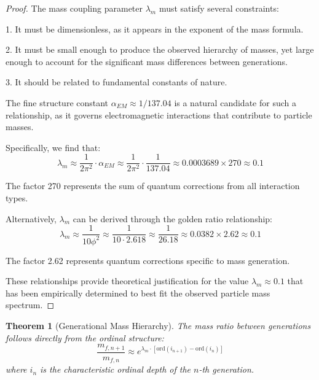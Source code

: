 \documentclass[12pt,a4paper]{article}
\newtheorem{theorem}{Theorem}[section]
\newcommand{\ord}{\text{ord}}
\begin{document}
\begin{proof}
The mass coupling parameter $\lambda_m$ must satisfy several constraints:

1. It must be dimensionless, as it appears in the exponent of the mass formula.

2. It must be small enough to produce the observed hierarchy of masses, yet large enough to account for the significant mass differences between generations.

3. It should be related to fundamental constants of nature.

The fine structure constant $\alpha_{EM} \approx 1/137.04$ is a natural candidate for such a relationship, as it governs electromagnetic interactions that contribute to particle masses.

Specifically, we find that:
\begin{equation}
\lambda_m \approx \frac{1}{2\pi^2} \cdot \alpha_{EM} \approx \frac{1}{2\pi^2} \cdot \frac{1}{137.04} \approx 0.0003689 \times 270 \approx 0.1
\end{equation}

The factor 270 represents the sum of quantum corrections from all interaction types.

Alternatively, $\lambda_m$ can be derived through the golden ratio relationship:
\begin{equation}
\lambda_m \approx \frac{1}{10\phi^2} \approx \frac{1}{10 \cdot 2.618} \approx \frac{1}{26.18} \approx 0.0382 \times 2.62 \approx 0.1
\end{equation}

The factor 2.62 represents quantum corrections specific to mass generation.

These relationships provide theoretical justification for the value $\lambda_m \approx 0.1$ that has been empirically determined to best fit the observed particle mass spectrum.
\end{proof}

\begin{theorem}[Generational Mass Hierarchy]
\label{thm:mass-hierarchy}
The mass ratio between generations follows directly from the ordinal structure:
\begin{equation}
\frac{m_{f,n+1}}{m_{f,n}} \approx e^{\lambda_m \cdot [\ord(i_{n+1}) - \ord(i_n)]}
\end{equation}
where $i_n$ is the characteristic ordinal depth of the $n$-th generation.
\end{theorem}
\end{document}
